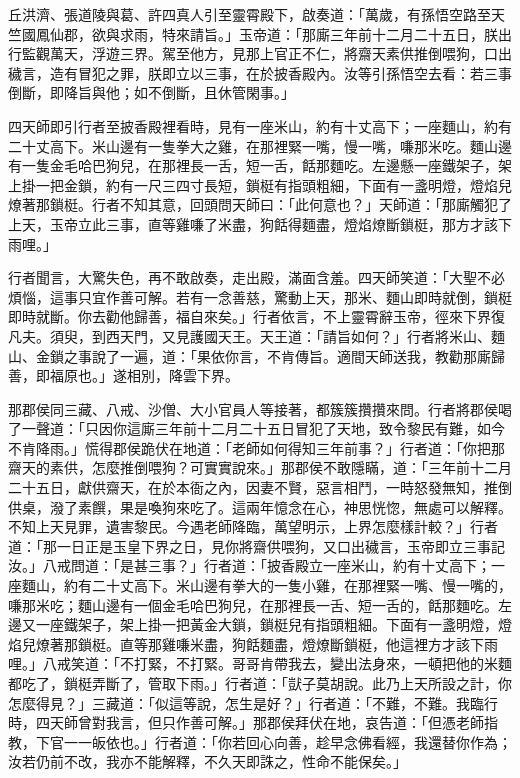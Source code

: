 丘洪濟、張道陵與葛、許四真人引至靈霄殿下，啟奏道：「萬歲，有孫悟空路至天竺國鳳仙郡，欲與求雨，特來請旨。」玉帝道：「那廝三年前十二月二十五日，朕出行監觀萬天，浮遊三界。駕至他方，見那上官正不仁，將齋天素供推倒喂狗，口出穢言，造有冒犯之罪，朕即立以三事，在於披香殿內。汝等引孫悟空去看：若三事倒斷，即降旨與他；如不倒斷，且休管閑事。」

四天師即引行者至披香殿裡看時，見有一座米山，約有十丈高下；一座麵山，約有二十丈高下。米山邊有一隻拳大之雞，在那裡緊一嘴，慢一嘴，嗛那米吃。麵山邊有一隻金毛哈巴狗兒，在那裡長一舌，短一舌，餂那麵吃。左邊懸一座鐵架子，架上掛一把金鎖，約有一尺三四寸長短，鎖梃有指頭粗細，下面有一盞明燈，燈焰兒燎著那鎖梃。行者不知其意，回頭問天師曰：「此何意也？」天師道：「那廝觸犯了上天，玉帝立此三事，直等雞嗛了米盡，狗餂得麵盡，燈焰燎斷鎖梃，那方才該下雨哩。」

行者聞言，大驚失色，再不敢啟奏，走出殿，滿面含羞。四天師笑道：「大聖不必煩惱，這事只宜作善可解。若有一念善慈，驚動上天，那米、麵山即時就倒，鎖梃即時就斷。你去勸他歸善，福自來矣。」行者依言，不上靈霄辭玉帝，徑來下界復凡夫。須臾，到西天門，又見護國天王。天王道：「請旨如何？」行者將米山、麵山、金鎖之事說了一遍，道：「果依你言，不肯傳旨。適間天師送我，教勸那廝歸善，即福原也。」遂相別，降雲下界。

那郡侯同三藏、八戒、沙僧、大小官員人等接著，都簇簇攢攢來問。行者將郡侯喝了一聲道：「只因你這廝三年前十二月二十五日冒犯了天地，致令黎民有難，如今不肯降雨。」慌得郡侯跪伏在地道：「老師如何得知三年前事？」行者道：「你把那齋天的素供，怎麼推倒喂狗？可實實說來。」那郡侯不敢隱瞞，道：「三年前十二月二十五日，獻供齋天，在於本衙之內，因妻不賢，惡言相鬥，一時怒發無知，推倒供桌，潑了素饌，果是喚狗來吃了。這兩年憶念在心，神思恍惚，無處可以解釋。不知上天見罪，遺害黎民。今遇老師降臨，萬望明示，上界怎麼樣計較？」行者道：「那一日正是玉皇下界之日，見你將齋供喂狗，又口出穢言，玉帝即立三事記汝。」八戒問道：「是甚三事？」行者道：「披香殿立一座米山，約有十丈高下；一座麵山，約有二十丈高下。米山邊有拳大的一隻小雞，在那裡緊一嘴、慢一嘴的，嗛那米吃；麵山邊有一個金毛哈巴狗兒，在那裡長一舌、短一舌的，餂那麵吃。左邊又一座鐵架子，架上掛一把黃金大鎖，鎖梃兒有指頭粗細。下面有一盞明燈，燈焰兒燎著那鎖梃。直等那雞嗛米盡，狗餂麵盡，燈燎斷鎖梃，他這裡方才該下雨哩。」八戒笑道：「不打緊，不打緊。哥哥肯帶我去，變出法身來，一頓把他的米麵都吃了，鎖梃弄斷了，管取下雨。」行者道：「獃子莫胡說。此乃上天所設之計，你怎麼得見？」三藏道：「似這等說，怎生是好？」行者道：「不難，不難。我臨行時，四天師曾對我言，但只作善可解。」那郡侯拜伏在地，哀告道：「但憑老師指教，下官一一皈依也。」行者道：「你若回心向善，趁早念佛看經，我還替你作為；汝若仍前不改，我亦不能解釋，不久天即誅之，性命不能保矣。」

